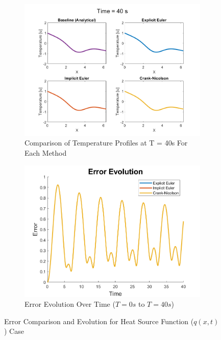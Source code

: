 \documentclass[10pt, letter, showtrims]{extarticle}
\begin{document}
		
		\FloatBarrier
		\begin{figure}[!h]
			\captionsetup[subfigure]{justification=centering}
			\centering
			
			\begin{subfigure}{.45\textwidth}
				\centering
				\includegraphics[width=1\linewidth]{"Figures/MATLAB/SourceCompare"}
				\caption{Comparison of Temperature Profiles at T = 40s For Each Method}
				\label{fig:compsource}
			\end{subfigure}
			\begin{subfigure}{.45\textwidth}
				\centering
				\includegraphics[width=1\linewidth]{"Figures/MATLAB/SourceErrorTime"}
				\caption{Error Evolution Over Time ($T = 0s$ to $T = 40s$)}
				\label{fig:evolutionsource}
			\end{subfigure}
			
			\caption{Error Comparison and Evolution for Heat Source Function ($q(x, t)$) Case}
			\label{fig:source}
		\end{figure}
		\FloatBarrier
		
\end{document}
